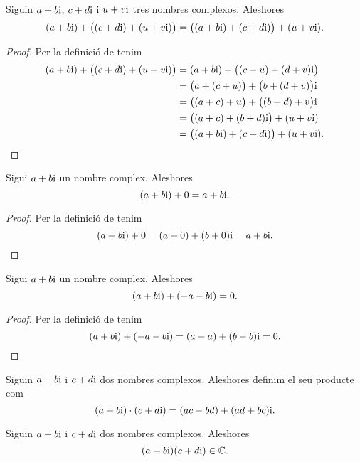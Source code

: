 \documentclass[../Apunts.tex]{subfiles}
\begin{document}
	\begin{proposition}
		\label{prop:els nombres complexos són associatius per la suma}
		Siguin \(a+b\mathrm{i}\), \(c+d\mathrm{i}\) i \(u+v\mathrm{i}\) tres nombres complexos. Aleshores
		\[(a+b\mathrm{i})+\big((c+d\mathrm{i})+(u+v\mathrm{i})\big)=\big((a+b\mathrm{i})+(c+d\mathrm{i})\big)+(u+v\mathrm{i}).\]
		\begin{proof}
			Per la definició de  tenim
			\begin{align*}
				(a+b\mathrm{i})+\big((c+d\mathrm{i})+(u+v\mathrm{i})\big)&=(a+b\mathrm{i})+\big((c+u)+(d+v)\mathrm{i}\big) \\
				&=\big(a+(c+u)\big)+\big(b+(d+v)\big)\mathrm{i} \\
				&=\big((a+c)+u\big)+\big((b+d)+v\big)\mathrm{i} \\
				&=\big((a+c)+(b+d)\mathrm{i}\big)+(u+v\mathrm{i}) \\
				&=\big((a+b\mathrm{i})+(c+d\mathrm{i})\big)+(u+v\mathrm{i}).\qedhere
			\end{align*}
		\end{proof}
	\end{proposition}
	\begin{proposition}
		\label{prop:element neutre per la suma dels complexos}
		Sigui \(a+b\mathrm{i}\) un nombre complex. Aleshores
		\[(a+b\mathrm{i})+0=a+b\mathrm{i}.\]
		\begin{proof}
			Per la definició de \myref{def:suma de nombres complexos} tenim
			\[(a+b\mathrm{i})+0=(a+0)+(b+0)\mathrm{i}=a+b\mathrm{i}.\qedhere\]
		\end{proof}
	\end{proposition}
	\begin{proposition}
		\label{prop:element invers per la suma dels complexos}
		Sigui \(a+b\mathrm{i}\) un nombre complex. Aleshores
		\[(a+b\mathrm{i})+(-a-b\mathrm{i})=0.\]
		\begin{proof}
			Per la definició de  tenim
			\[(a+b\mathrm{i})+(-a-b\mathrm{i})=(a-a)+(b-b)\mathrm{i}=0.\qedhere\]
		\end{proof}
	\end{proposition}
	\begin{definition}
		\label{def:producte de nombres complexos}
		Siguin \(a+b\mathrm{i}\) i \(c+d\mathrm{i}\) dos nombres complexos. Aleshores definim el seu producte com
		\[(a+b\mathrm{i})\cdot(c+d\mathrm{i})=(ac-bd)+(ad+bc)\mathrm{i}.\]
	\end{definition}
	\begin{observation}
		\label{obs:els nombres complexos estan tancats pel producte}
		Siguin \(a+b\mathrm{i}\) i \(c+d\mathrm{i}\) dos nombres complexos. Aleshores
		\[(a+b\mathrm{i})(c+d\mathrm{i})\in\mathbb{C}.\]
	\end{observation}
\end{document}
